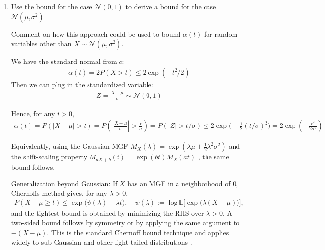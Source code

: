 \documentclass[10pt]{article}
\begin{document}
\begin{enumerate}[label=(\roman*)]
\begin{enumerate}[label=(\alph*)]
        \item Use the bound for the case $\mathcal{N}(0, 1)$ to derive a bound for the case $\mathcal{N}(\mu, \sigma^2) $
        
        Comment on how this approach could be used to bound $\alpha(t) $ for random variables other than $X \sim \mathcal{N}(\mu, \sigma^2)$.

        We have the standard normal from $c $:
        \begin{gather*}
            \alpha(t) = 2P(X > t) \le 2\exp(-t^2 / 2)
        \end{gather*}
        Then we can plug in the standardized variable:
        \begin{gather*}
            Z = \frac{X - \mu}{\sigma} \sim \mathcal{N}(0, 1)
        \end{gather*}

        Hence, for any $t > 0 $,
        \begin{gather*}
            \alpha(t) = P(|X - \mu| > t) = P\left(\left|\frac{X - \mu}{\sigma}\right| > \frac{t}{\sigma} \right) = P(|Z| > t/\sigma) \le 2\exp\big(-\frac{1}{2}(t / \sigma)^2\big) = 2\exp\left(-\frac{t^2}{2\sigma^2}\right)
        \end{gather*}


        Equivalently, using the Gaussian MGF $M_X(\lambda) = \exp(\lambda\mu + \frac{1}{2}\lambda^2\sigma^2)$ and the shift-scaling property $M_{aX + b}(t) = \exp(bt)M_X(at)$ \cite[Appendix A, \textsc{Lemma 2} and \textsc{Proposition 2}]{appendix}, the same bound follows.
        
        Generalization beyond Gaussian: If $X $ has an MGF in a neighborhood of $0 $, Chernoffs method gives, for any $\lambda > 0 $,
        \begin{gather*}
            P(X - \mu \ge t) \le \exp\big(\psi(\lambda) - \lambda t\big), \quad\psi(\lambda):=\log \mathbb{E}\big[\exp\big(\lambda(X - \mu)\big)\big],
        \end{gather*}
        and the tightest bound is obtained by minimizing the RHS over $\lambda > 0 $. A two-sided bound follows by symmetry or by applying the same argument to $-(X - \mu)$. This is the standard Chernoff bound technique and applies widely to sub-Gaussian and other light-tailed distributions \cite[Chapter 2, sec. 2.3]{Vershynin2018}.
    \end{enumerate}
    
\end{enumerate}
\end{document}
